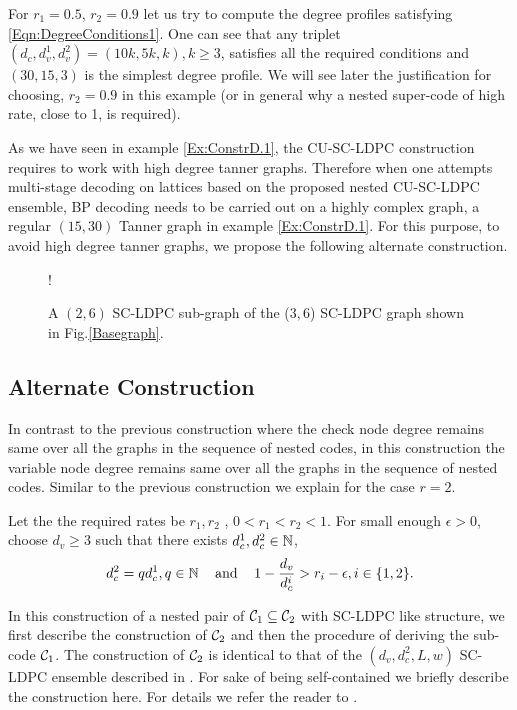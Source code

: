\begin{example}\label{Ex:ConstrD.1}
For $r_{1}=0.5$, $r_{2}=0.9$ let us try to compute the degree profiles satisfying \eqref{Eqn:DegreeConditions1}. One can see that      any triplet $(d_{c},d_{v}^{1},d_{v}^{2})=(10k, 5k, k), k\geq 3$, satisfies all the required conditions and $(30, 15, 3)$ is the simplest degree profile. We will see later the justification for choosing, $r_{2}=0.9$ in this example (or in general why a nested super-code of high rate, close to 1, is required).
\end{example}
As we have seen in example \ref{Ex:ConstrD.1}, the CU-SC-LDPC construction requires to work with high degree tanner graphs. Therefore when one attempts multi-stage decoding on lattices based on the proposed nested CU-SC-LDPC ensemble, BP decoding needs to be carried out on a highly complex graph, a regular $(15,30)$ Tanner graph in example \ref{Ex:ConstrD.1}. For this purpose, to avoid high degree tanner graphs, we propose the following alternate construction.

\begin{figure}[ht!]
\centering
{} {!} {

}
\caption{A $(2,6)$ SC-LDPC sub-graph of the ($3,6$) SC-LDPC graph shown in Fig.\ref{Basegraph}.}
\label{BaseGraph_sup}
\end{figure}

\subsection{Alternate Construction}
In contrast to the previous construction where the check node degree remains same over all the graphs in the sequence of nested codes, in this construction the variable node degree remains same over all the graphs in the sequence of nested codes. Similar to the previous construction we explain for the case $r=2$.

Let the the required rates be $r_{1}, r_{2}$ , $0<r_{1}<r_{2}<1$. For small enough $\epsilon >0$, choose $d_{v}\geq 3$ such that there exists $d_{c}^{1},d_{c}^{2}\in \mathbb{N}$,
\begin{align}
		d_{c}^{2}=q d_{c}^{1}, q\in \mathbb{N} \hspace{0.3cm} \text{  and } \hspace{0.3cm}   1-\frac{d_{v}}{d_{c}^{i}}>r_{i}-\epsilon, i\in \{1,2\}.
\label{Eqn:DegreeConditions2}
\end{align}

In this construction of a nested pair of $\mathcal{C}_{1}\subseteq \mathcal{C}_{2}$ with SC-LDPC like structure, we first describe the construction of $\mathcal{C}_{2}$ and then the procedure of deriving the sub-code $\mathcal{C}_{1}$. The construction of $\mathcal{C}_{2}$ is identical to that of the $(d_{v},d_{c}^{2},L,w)$ SC-LDPC ensemble described in \cite{KudekarUrbanke11}. For sake of being self-contained we briefly describe the construction here. For details we refer the reader to  \cite{KudekarUrbanke11}.


